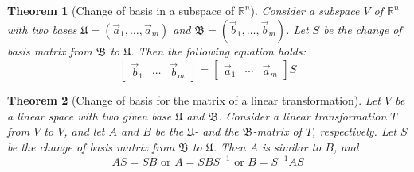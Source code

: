 \documentclass[letter]{article}
\newcommand{\R}{\mathbb{R}}
\newcommand{\B}{\mathfrak{B}}
\newcommand{\U}{\mathfrak{U}}
\newtheorem{theorem}{Theorem}[section]
\begin{document}
\begin{theorem}[Change of basis in a subspace of $\R^n$]
Consider a subspace $V$ of $\R^n$ with two bases $\U = (\vec a_1, \ldots, \vec a_m)$ and $\B = (\vec b_1, \ldots, \vec b_m)$. Let $S$ be the change of basis matrix from $\B$ to $\U$. Then the following equation holds:
\[
\begin{bmatrix}
\vec b_1& \cdots & \vec b_m
\end{bmatrix}
= 
\begin{bmatrix}
\vec a_1& \cdots & \vec a_m
\end{bmatrix}S
\]
\end{theorem}

\begin{theorem}[Change of basis for the matrix of a linear transformation]
Let $V$ be a linear space with two given base $\U$ and $\B$. Consider a linear transformation $T$ from $V$ to $V$, and let $A$ and $B$ be the $\U$- and the $\B$-matrix of $T$, respectively. Let $S$ be the change of basis matrix from $\B$ to $\U$. Then $A$ is similar to $B$, and
\[AS = SB \text{ or } A = SBS^{-1} \text{ or } B = S^{-1}AS\]
\end{theorem}
\end{document}
